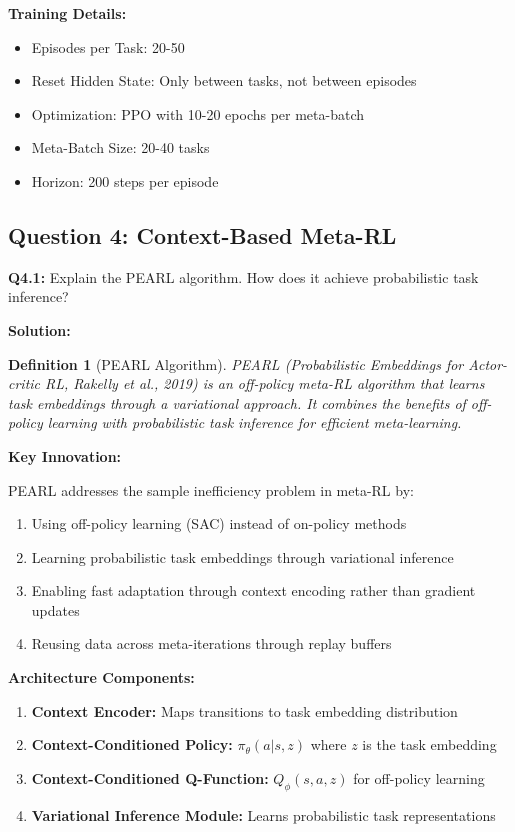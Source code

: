\documentclass[12pt]{article}
\newcommand{\ieee}[1]{\textcolor{IEEEBlue}{\textbf{#1}}}
\newtheorem{definition}{Definition}
\begin{document}
{{			\textbf{Training Details:}
			
			\begin{itemize}
				\item Episodes per Task: 20-50
				\item Reset Hidden State: Only between tasks, not between episodes
				\item Optimization: PPO with 10-20 epochs per meta-batch
				\item Meta-Batch Size: 20-40 tasks
				\item Horizon: 200 steps per episode
			\end{itemize}
			
			\subsection{Question 4: Context-Based Meta-RL}
			
			\textbf{Q4.1:} Explain the PEARL algorithm. How does it achieve probabilistic task inference?
			
			\textbf{Solution:}
			
			\begin{definition}[PEARL Algorithm]
			PEARL (Probabilistic Embeddings for Actor-critic RL, Rakelly et al., 2019) is an off-policy meta-RL algorithm that learns task embeddings through a variational approach. It combines the benefits of off-policy learning with probabilistic task inference for efficient meta-learning.
			\end{definition}
			
			\ieee{Key Innovation:}
			
			PEARL addresses the sample inefficiency problem in meta-RL by:
			
			\begin{enumerate}
				\item Using off-policy learning (SAC) instead of on-policy methods
				\item Learning probabilistic task embeddings through variational inference
				\item Enabling fast adaptation through context encoding rather than gradient updates
				\item Reusing data across meta-iterations through replay buffers
			\end{enumerate}
			
			\ieee{Architecture Components:}
			
			\begin{enumerate}
				\item \textbf{Context Encoder:} Maps transitions to task embedding distribution
				\item \textbf{Context-Conditioned Policy:} $\pi_\theta(a|s, z)$ where $z$ is the task embedding
				\item \textbf{Context-Conditioned Q-Function:} $Q_\phi(s, a, z)$ for off-policy learning
				\item \textbf{Variational Inference Module:} Learns probabilistic task representations
			\end{enumerate}
			
}}
\end{document}
